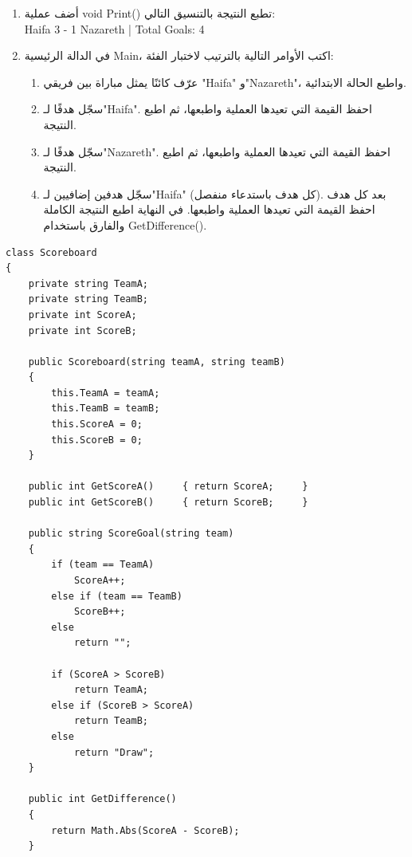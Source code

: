 \documentclass[14pt]{extarticle}
\begin{document}
\begin{enumerate}[itemsep=2em]
\begin{enumerate}[itemsep=1em]
    \item أضف عملية \textenglish{void Print()} تطبع النتيجة بالتنسيق التالي:\\
    \textenglish{Haifa 3 - 1 Nazareth | Total Goals: 4}

    \item في الدالة الرئيسية \textenglish{Main}، اكتب الأوامر التالية بالترتيب لاختبار الفئة:
    \begin{enumerate}[itemsep=1pt, label=(\roman*)]
        \item عرّف كائنًا يمثل مباراة بين فريقي \textenglish{"Haifa"} و\textenglish{"Nazareth"}، واطبع الحالة الابتدائية.
        \item سجّل هدفًا لـ\textenglish{"Haifa"}. احفظ القيمة التي تعيدها العملية واطبعها، ثم اطبع النتيجة.
        \item سجّل هدفًا لـ\textenglish{"Nazareth"}. احفظ القيمة التي تعيدها العملية واطبعها، ثم اطبع النتيجة.
        \item سجّل هدفين إضافيين لـ\textenglish{"Haifa"} (كل هدف باستدعاء منفصل). بعد كل هدف احفظ القيمة التي تعيدها العملية واطبعها. في النهاية اطبع النتيجة الكاملة والفارق باستخدام \textenglish{GetDifference()}.
    \end{enumerate}
\end{enumerate}

\ifwithsols
{\small
\begin{boxSolution}
\begin{english}
\begin{verbatim}
class Scoreboard
{
    private string TeamA;
    private string TeamB;
    private int ScoreA;
    private int ScoreB;

    public Scoreboard(string teamA, string teamB)
    {
        this.TeamA = teamA;
        this.TeamB = teamB;
        this.ScoreA = 0;
        this.ScoreB = 0;
    }

    public int GetScoreA()     { return ScoreA;     }
    public int GetScoreB()     { return ScoreB;     }

    public string ScoreGoal(string team)
    {
        if (team == TeamA)
            ScoreA++;
        else if (team == TeamB)
            ScoreB++;
        else
            return "";

        if (ScoreA > ScoreB)
            return TeamA;
        else if (ScoreB > ScoreA)
            return TeamB;
        else
            return "Draw";
    }

    public int GetDifference()
    {
        return Math.Abs(ScoreA - ScoreB);
    }
\end{verbatim}
\end{english}
\end{boxSolution}
\begin{boxSolution}
\begin{english}
\begin{verbatim}


\end{verbatim}
\end{english}
\end{boxSolution}}
\end{enumerate}
\end{document}
